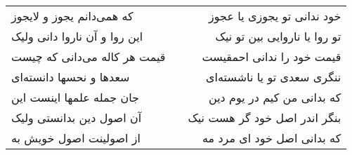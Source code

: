 \begin{center}
\begin{longtable}{l p{0.5cm} r}
که همی‌دانم یجوز و لایجوز
&&
خود ندانی تو یجوزی یا عجوز
\\
این روا و آن ناروا دانی ولیک
&&
تو روا یا ناروایی بین تو نیک
\\
قیمت هر کاله می‌دانی که چیست
&&
قیمت خود را ندانی احمقیست
\\
سعدها و نحسها دانسته‌ای
&&
ننگری سعدی تو یا ناشسته‌ای
\\
جان جمله علمها اینست این
&&
که بدانی من کیم در یوم دین
\\
آن اصول دین بدانستی ولیک
&&
بنگر اندر اصل خود گر هست نیک
\\
از اصولینت اصول خویش به
&&
که بدانی اصل خود ای مرد مه
\\
\end{longtable}
\end{center}
